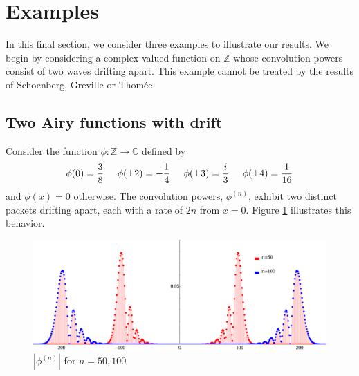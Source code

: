 \documentclass{article}
\theoremstyle{theorem}
\theoremstyle{remark}
\begin{document}
\section{Examples}\label{exsec}
In this final section, we consider three examples to illustrate our results. We begin by considering a complex valued function on $\mathbb{Z}$ whose convolution powers consist of two waves drifting apart. This example cannot be treated by the results of Schoenberg, Greville or Thom\'{e}e. 

\subsection{Two Airy functions with drift}\label{airyex}

Consider the function $\phi:\mathbb{Z}\rightarrow\mathbb{C}$ defined by
\begin{equation*}
\phi(0)=\frac{3}{8}\hspace{.5cm}\phi(\pm 2)=-\frac{1}{4}\hspace{.5cm}\phi(\pm 3)=\frac{i}{3}\hspace{.5cm}\phi(\pm 4)=\frac{1}{16}
\end{equation*}
and $\phi(x)=0$ otherwise. The convolution powers, $\phi^{(n)}$, exhibit two distinct packets drifting apart, each with a rate of $2n$ from $x=0$. Figure \ref{fig:ex3_waves} illustrates this behavior. 

\begin{figure}[h!]
\centering\includegraphics[width=4.7in]{ex3_waves.eps}
\caption{$|\phi^{(n)}|$ for $n=50,100$}
\label{fig:ex3_waves}
\end{figure}
\end{document}
